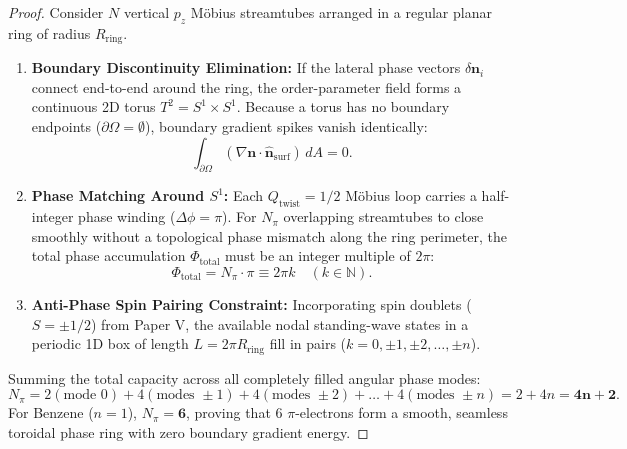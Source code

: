 \documentclass[11pt,a4paper]{article}
\begin{document}
	\begin{proof}
		Consider $N$ vertical $p_z$ Möbius streamtubes arranged in a regular planar ring of radius $R_{\text{ring}}$.
		
		\begin{enumerate}
			\item \textbf{Boundary Discontinuity Elimination:} If the lateral phase vectors $\delta \mathbf{n}_i$ connect end-to-end around the ring, the order-parameter field forms a continuous 2D torus $T^2 = S^1 \times S^1$. Because a torus has no boundary endpoints ($\partial \Omega = \emptyset$), boundary gradient spikes vanish identically:
			\begin{equation}
				\int_{\partial \Omega} (\nabla \mathbf{n} \cdot \hat{\mathbf{n}}_{\text{surf}}) \, dA = 0.
			\end{equation}
			
			\item \textbf{Phase Matching Around $S^1$:} Each $Q_{\text{twist}} = 1/2$ Möbius loop carries a half-integer phase winding ($\Delta \phi = \pi$). For $N_\pi$ overlapping streamtubes to close smoothly without a topological phase mismatch along the ring perimeter, the total phase accumulation $\Phi_{\text{total}}$ must be an integer multiple of $2\pi$:
			\begin{equation}
				\Phi_{\text{total}} = N_\pi \cdot \pi \equiv 2\pi k \quad (k \in \mathbb{N}).
			\end{equation}
			
			\item \textbf{Anti-Phase Spin Pairing Constraint:} Incorporating spin doublets ($S = \pm 1/2$) from Paper V, the available nodal standing-wave states in a periodic 1D box of length $L = 2\pi R_{\text{ring}}$ fill in pairs ($k = 0, \pm 1, \pm 2, \dots, \pm n$).
		\end{enumerate}
		
		Summing the total capacity across all completely filled angular phase modes:
		\begin{equation}
			N_\pi = 2 (\text{mode } 0) + 4 (\text{modes } \pm 1) + 4 (\text{modes } \pm 2) + \dots + 4 (\text{modes } \pm n) = 2 + 4n = \mathbf{4n + 2}.
			\label{eq:hueckel_capacity_proof}
		\end{equation}
		For Benzene ($n=1$), $N_\pi = \mathbf{6}$, proving that 6 $\pi$-electrons form a smooth, seamless toroidal phase ring with zero boundary gradient energy.
	\end{proof}
	
\end{document}
